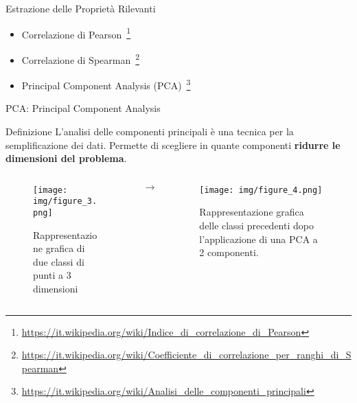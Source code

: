 \documentclass[10pt]{beamer}
\begin{document}
	\begin{frame}{Estrazione delle Proprietà Rilevanti}

		\begin{itemize}
			\item Correlazione di Pearson~\footnote{\tiny{\url{https://it.wikipedia.org/wiki/Indice_di_correlazione_di_Pearson}}}
			\item Correlazione di Spearman~\footnote{\tiny{\url{https://it.wikipedia.org/wiki/Coefficiente_di_correlazione_per_ranghi_di_Spearman}}}
			\item Principal Component Analysis (PCA)~\footnote{\tiny{\url{https://it.wikipedia.org/wiki/Analisi_delle_componenti_principali}}}
		\end{itemize}
	
	\end{frame}

	\begin{frame}{PCA: Principal Component Analysis}

		\begin{alertblock}{Definizione}
			L'analisi delle componenti principali è una tecnica per la semplificazione dei dati. Permette di scegliere in quante componenti \textbf{ridurre le dimensioni del problema}.
		\end{alertblock}

		\begin{columns}
			\begin{column}{0.5\textwidth}

				\begin{figure}[4]
					\texttt{[image: img/figure\_3.png]}
					\caption{\tiny{Rappresentazione grafica di due classi di punti a $3$ dimensioni}}
				\end{figure}

			\end{column}

			$\rightarrow$

			\begin{column}{0.5\textwidth}

				\begin{figure}[5]
					\texttt{[image: img/figure\_4.png]}
					\caption{\tiny{Rappresentazione grafica delle classi precedenti dopo l'applicazione di una PCA a 2 componenti.}}
				\end{figure}

			\end{column}
		\end{columns}

	\end{frame}
\end{document}
